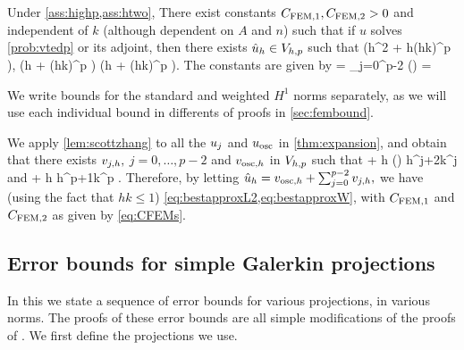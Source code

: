 
\label{lem:bestapprox}
Under \cref{ass:highp,ass:htwo}, There exist constants $C_{\mathrm{FEM},1}, C_{\mathrm{FEM},2} > 0$ and independent of $k$ (although dependent on $A$ and $n$) such that if $u$ solves \cref{prob:vtedp} or its adjoint, then there exists $\hat{u}_{h} \in V_{h,p}$ such that
\beq\label{eq:bestapproxL2}
 \leq \mleft(\CFEMo h^2 + \CFEMt \CAnk h\mleft(hk\mright)^p \mright)\Cfg,
\eeq
\beq\label{eq:bestapproxH1}
 \leq \mleft(\CFEMo h + \CFEMt \CAnk \mleft(hk\mright)^p \mright)\Cfg \tand
\eeq
\beq\label{eq:bestapproxW}
 \mleft(\CFEMo h + \CFEMt \CAnk \mleft(hk\mright)^p \mright)\Cfg.
\eeq
The constants are given by
\beq\label{eq:CFEMs}
\CFEMo = \sum_{j=0}^{p-2} \Pj\mleft(\mright) \tand \CFEMt = \Cosc
\eeq
\ele

We write bounds for the standard and weighted $H^1$ norms separately, as we will use each individual bound in differents of proofs in \cref{sec:fembound}.

We apply \cref{lem:scottzhang} to all the $u_{j}$ and $u_{\mathrm{osc}}$ in \cref{thm:expansion}, and obtain that there exists $v_{j,h},$ $j=0,\ldots,p-2$ and $v_{\mathrm{osc},h}$ in $V_{h,p}$ such that 
\beqs
\NLtD{\usj - \vjh} + h\NHoD{\usj - \vjh} \leq {} \Pj\mleft(\mright) h^{j+2}k^j \Cfg
\eeqs
and
\beqs
\NLtD{\uosc - \vosch} + h\NHoD{\uosc - \vosch} \leq {} \Cosc\CAnk h^{p+1}k^p \Cfg.
\eeqs
Therefore, by letting $\hat{u}_{h} = v_{\mathrm{osc},h} + \sum_{j=0}^{p-2} v_{j,h},$ we have (using the fact that $hk \leq 1$) \cref{eq:bestapproxL2,eq:bestapproxW}, with $C_{\mathrm{FEM},1}$ and $C_{\mathrm{FEM},2}$ as given by \cref{eq:CFEMs}.
\epf

\subsection{Error bounds for simple Galerkin projections}\label{sec:errgalerkin}
In this  we state a sequence of error bounds for various projections, in various norms. The proofs of these error bounds are all simple modifications of the proofs of \cite[Theorem 5.8.3]{BrSc:08}. %
We first define the projections we use.

